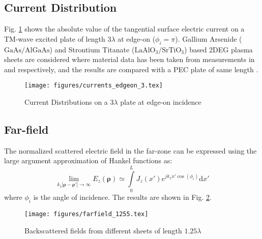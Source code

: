 \documentclass[conference, 10pt]{IEEEtran}
\renewcommand{\v}[1]{\mathbf{#1}} %
\newcommand{\p}{\rho}  %
\renewcommand{\inf}{\infty}  %
\renewcommand{\^}{\hat}  %
\begin{document}
\subsection{Current Distribution}
%
Fig. \ref{fig:edgeon} shows the absolute value of the tangential surface electric current on a TM-wave excited plate of length $3 \lambda$ at edge-on ($\phi_i = \pi$). Gallium Arsenide ($\mathrm{GaAs}/\mathrm{AlGaAs}$) and Strontium Titanate ($\mathrm{LaAlO_3}/\mathrm{SrTiO_3}$) based 2DEG plasma sheets are considered where material data has been taken from measurements in \cite{burke2000high} and \cite{herranz2012high} respectively, and the results are compared with a PEC plate of same length \cite{senior1979backscattering}.

%
\begin{figure}[h]
  \begin{center}
    \noindent
    \texttt{[image: figures/currents\_edgeon\_3.tex]}
    \caption{Current Distributions on a $3\lambda$ plate at edge-on incidence}
    \label{fig:edgeon}
  \end{center}
\end{figure}
%
%   
%
%   
%
\subsection{Far-field}
%
The normalized scattered electric field in the far-zone can be expressed using the large argument approximation of Hankel functions as:
%
\begin{equation}
  \lim_{k_1|\v \p - \v \p'|\to\inf} E_z(\v \p) \simeq \int \limits_{0}^{L} J_z(x') e^{j k_1 x' \cos(\phi_i)} \mathrm{d}x'
  \label{eq:far-field}
\end{equation}
%
where $\phi_i$ is the angle of incidence. The results are shown in Fig. \ref{fig:rcs}.
%
\begin{figure}[h]
  \begin{center}
    \noindent
    \texttt{[image: figures/farfield\_1255.tex]}
    \caption{Backscattered fields from different sheets of length $1.25\lambda$}
    \label{fig:rcs}
  \end{center}
\end{figure}
%   
\end{document}

